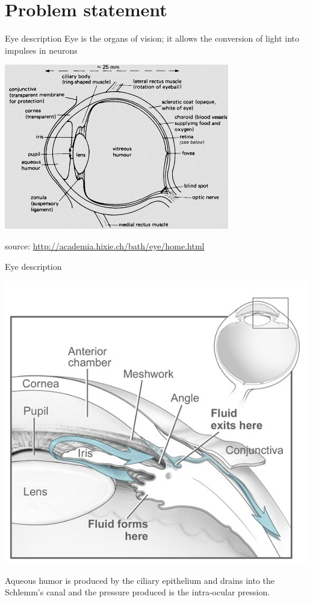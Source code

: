 \documentclass[9pt]{beamer}
\title{}
\begin{document}
\begin{frame}{}
  \maketitle
\end{frame}

\section{Problem statement}

\begin{frame}{Eye description}
Eye is the organs of vision; it allows the conversion of light into impulses in neurons
\begin{center}
\includegraphics[width=.7\linewidth]{Eye.jpg}
\end{center}
\tiny{source: \url{http://academia.hixie.ch/bath/eye/home.html}}
\end{frame}

\begin{frame}{Eye description}
\begin{center}
\includegraphics[width=.5\linewidth]{Humor.jpg}
\end{center}
Aqueous humor is produced by the ciliary epithelium and drains into the Schlemm's canal and the pressure produced is the intra-ocular pression.


\end{frame}
\end{document}

